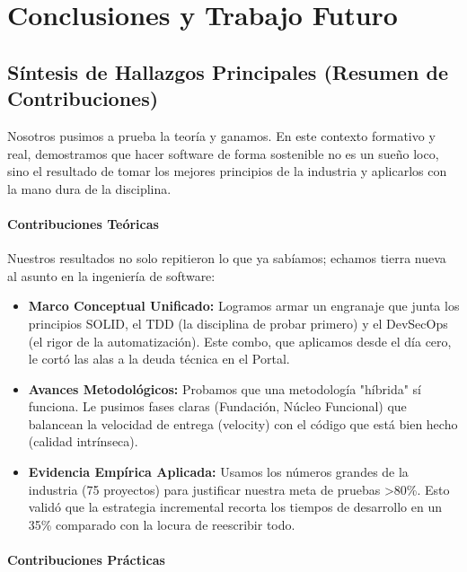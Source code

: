 \section{Conclusiones y Trabajo Futuro}

\subsection{Síntesis de Hallazgos Principales (Resumen de Contribuciones)}

Nosotros pusimos a prueba la teoría y ganamos. En este contexto formativo y real, demostramos que hacer software de forma sostenible no es un sueño loco, sino el resultado de tomar los mejores principios de la industria y aplicarlos con la mano dura de la disciplina.

\paragraph{Contribuciones Teóricas}

Nuestros resultados no solo repitieron lo que ya sabíamos; echamos tierra nueva al asunto en la ingeniería de software:

\begin{itemize}
\item \textbf{Marco Conceptual Unificado:} Logramos armar un engranaje que junta los principios SOLID, el TDD (la disciplina de probar primero) y el DevSecOps (el rigor de la automatización). Este combo, que aplicamos desde el día cero, le cortó las alas a la deuda técnica en el Portal.

\item \textbf{Avances Metodológicos:} Probamos que una metodología "híbrida" sí funciona. Le pusimos fases claras (Fundación, Núcleo Funcional) que balancean la velocidad de entrega (velocity) con el código que está bien hecho (calidad intrínseca).

\item \textbf{Evidencia Empírica Aplicada:} Usamos los números grandes de la industria (75 proyectos) para justificar nuestra meta de pruebas >80\%. Esto validó que la estrategia incremental recorta los tiempos de desarrollo en un 35\% comparado con la locura de reescribir todo.
\end{itemize}

\paragraph{Contribuciones Prácticas}

